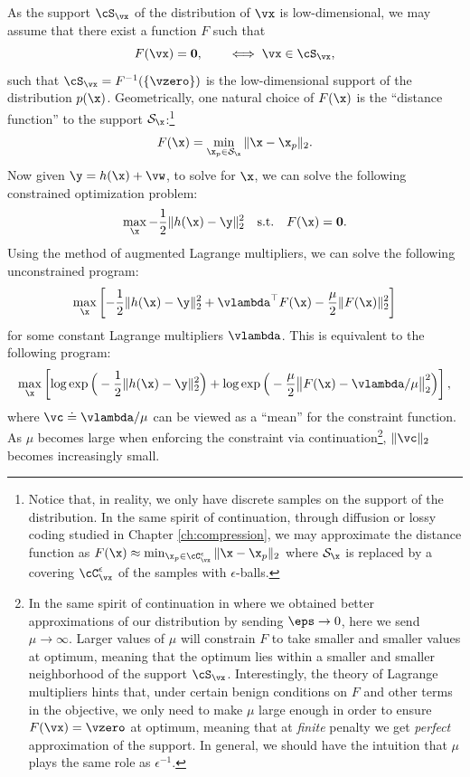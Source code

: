 \documentclass[../../book-main.tex]{subfiles}
\begin{document}
As the support \(\cS_{\vx}\) of the distribution of \(\vx\) is low-dimensional, we may assume that there exist a function \(F\) such that
\begin{equation}
  F(\vx) = \boldsymbol{0}, \qquad \iff \vx \in \cS_{\vx},
\end{equation}
such that \(\cS_{\vx} = F^{-1}(\{\vzero\})\) is the low-dimensional support of the distribution $p(\x)$. Geometrically, one natural choice of $F(\x)$ is the ``distance function'' to the support $\mathcal{S}_{\x}$:\footnote{Notice that, in reality, we only have discrete samples on the support of the distribution. In the same spirit of continuation, through diffusion or lossy coding studied in Chapter \ref{ch:compression},  we may approximate the distance function as $    F(\x) \approx \min_{\x_p \in \cC_{\vx}^{\epsilon}} \|\x - \x_p\|_2$ where $\mathcal{S}_{\x}$ is replaced by a covering \(\cC_{\vx}^{\epsilon}\) of the samples with $\epsilon$-balls. }
\begin{equation}
    F(\x) = \min_{\x_p \in \mathcal{S}_{\x}} \|\x - \x_p\|_2. 
\end{equation}
Now given $\y = h(\x) +\vw$, to solve for $\x$, we can solve the following constrained optimization problem:
\begin{equation}
    \max_{\x} - \frac{1}{2}\|h(\x) - \y\|_2^2 \quad \mbox{s.t.} \quad F(\x) = \boldsymbol{0}. 
\end{equation}
Using the method of augmented Lagrange multipliers, we can solve the following unconstrained program:
\begin{equation}
   \max_{\x} \left[-\frac{1}{2}\|h(\x) - \y\|_2^2  + \vlambda^{\top} F(\x) - \frac{\mu}{2} \|F(\x)\|_2^2\right]
\end{equation}
for some constant Lagrange multipliers $\vlambda$.
This is equivalent to the following program:
\begin{equation}\label{eq:lagrange_multiplier_continuation}
\max_{\x} \left[\log \exp\Big(- \frac{1}{2}\|h(\x) - \y\|_2^2\Big) + \log \exp\Big( - \frac{\mu}{2} \big\|F(\x) - \vlambda/\mu\big\|_2^2\Big)\right],
\end{equation} 
where $\vc \doteq {\vlambda}/{\mu}$ can be viewed as a ``mean''  for the constraint function. As $\mu$ becomes large when enforcing the constraint via continuation\footnote{In the same spirit of continuation in  where we obtained better approximations of our distribution by sending \(\eps \to 0\), here we send \(\mu \to \infty\). Larger values of \(\mu\) will constrain \(F\) to take smaller and smaller values at optimum, meaning that the optimum lies within a smaller and smaller neighborhood of the support \(\cS_{\vx}\). Interestingly, the theory of Lagrange multipliers hints that, under certain benign conditions on \(F\) and other terms in the objective, we only need to make \(\mu\) large enough in order to ensure \(F(\vx) = \vzero\) at optimum, meaning that at \textit{finite} penalty we get \textit{perfect} approximation of the support. In general, we should have the intuition that \(\mu\) plays the same role as  \(\epsilon^{-1}\).}, $\|\vc\|_2$ becomes increasingly small.
\end{document}
